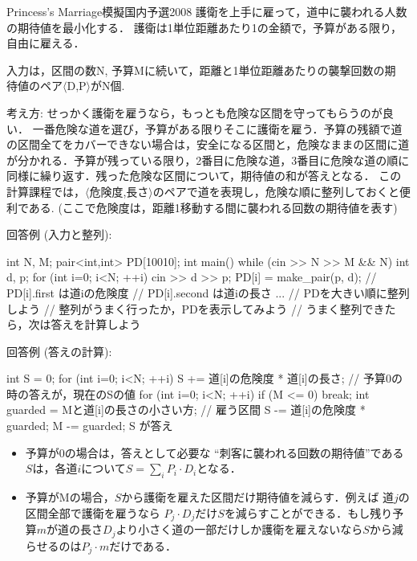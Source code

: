 \begin{pbox}{Princess's Marriage}{模擬国内予選2008}
護衛を上手に雇って，道中に襲われる人数の期待値を最小化する．
護衛は1単位距離あたり1の金額で，予算がある限り，自由に雇える．

入力は，区間の数N, 予算Mに続いて，距離と1単位距離あたりの襲撃回数の期
待値のペア$\langle$D,P$\rangle$がN個.  


\end{pbox}

考え方:
せっかく護衛を雇うなら，もっとも危険な区間を守ってもらうのが良い．
一番危険な道を選び，予算がある限りそこに護衛を雇う．予算の残額で道の区間全てをカバーできない場合は，安全になる区間と，危険なままの区間に道が分かれる．予算が残っている限り，2番目に危険な道，3番目に危険な道の順に同様に繰り返す．残った危険な区間について，期待値の和が答えとなる．
この計算課程では，$\langle$危険度,長さ$\rangle$のペアで道を表現し，危険な順に整列しておくと便利である.  (ここで危険度は，距離1移動する間に襲われる回数の期待値を表す)

回答例 (入力と整列):
\begin{cbox}
int N, M;
pair<int,int> PD[10010];
int main() {
  while (cin >> N >> M && N) {
    int d, p;
    for (int i=0; i<N; ++i) {
      cin >> d >> p;
      PD[i] = make_pair(p, d);
      // PD[i].first は道iの危険度
      // PD[i].second は道iの長さ
    }
    ... // PDを大きい順に整列しよう
    // 整列がうまく行ったか，PDを表示してみよう
    // うまく整列できたら，次は答えを計算しよう
  }
}
\end{cbox}

回答例 (答えの計算):
\begin{cbox}
    int S = 0;
    for (int i=0; i<N; ++i)
      S += 道[i]の危険度 * 道[i]の長さ;
    // 予算0の時の答えが，現在のSの値
    for (int i=0; i<N; ++i) {
      if (M <= 0) break;
      int guarded = Mと道[i]の長さの小さい方; // 雇う区間
      S -= 道[i]の危険度 * guarded;
      M -= guarded;
    }
    S が答え
\end{cbox}

\begin{itemize}
\item 予算が0の場合は，答えとして必要な ``刺客に襲われる回数の期待値''である $S$は，各道$i$について$S=\sum_i P_i\cdot{}D_i$となる．
\item 予算がMの場合，$S$から護衛を雇えた区間だけ期待値を減らす．例えば
  道$j$の区間全部で護衛を雇うなら $P_j\cdot{}D_j$だけ$S$を減らすことができる．もし残り予算$m$が道の長さ$D_j$より小さく道の一部だけしか護衛を雇えないなら$S$から減らせるのは$P_j\cdot{}m$だけである．
\end{itemize}

